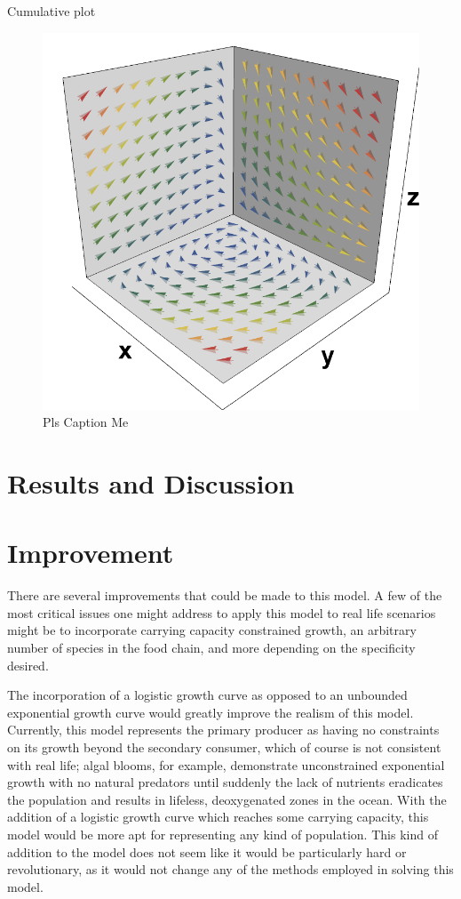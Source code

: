 \documentclass[11pt,oneside]{article}
\begin{document}
	Cumulative plot
	\begin{figure}[H]
		\center
		\includegraphics[scale=0.80]{XYZ}
		\caption{Pls Caption Me}
	\end{figure}
	
	
	\section{Results and Discussion}
	
	\section{Improvement}
	There are several improvements that could be made to this model. A few of the most critical issues one might address to apply this model to real life scenarios might be to incorporate carrying capacity constrained growth, an arbitrary number of species in the food chain, and more depending on the specificity desired.
	
	The incorporation of a logistic growth curve as opposed to an unbounded exponential growth curve would greatly improve the realism of this model. Currently, this model represents the primary producer as having no constraints on its growth beyond the secondary consumer, which of course is not consistent with real life; algal blooms, for example, demonstrate unconstrained exponential growth with no natural predators until suddenly the lack of nutrients eradicates the population and results in lifeless, deoxygenated zones in the ocean. With the addition of a logistic growth curve which reaches some carrying capacity, this model would be more apt for representing any kind of population. This kind of addition to the model does not seem like it would be particularly hard or revolutionary, as it would not change any of the methods employed in solving this model.
	
\end{document}
